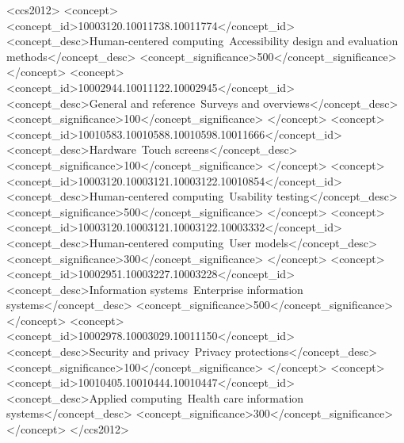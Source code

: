 \documentclass[manuscript, screen, review]{acmart}
\begin{document}
\begin{CCSXML}
<ccs2012>
   <concept>
       <concept_id>10003120.10011738.10011774</concept_id>
       <concept_desc>Human-centered computing~Accessibility design and evaluation methods</concept_desc>
       <concept_significance>500</concept_significance>
       </concept>
   <concept>
       <concept_id>10002944.10011122.10002945</concept_id>
       <concept_desc>General and reference~Surveys and overviews</concept_desc>
       <concept_significance>100</concept_significance>
       </concept>
   <concept>
       <concept_id>10010583.10010588.10010598.10011666</concept_id>
       <concept_desc>Hardware~Touch screens</concept_desc>
       <concept_significance>100</concept_significance>
       </concept>
   <concept>
       <concept_id>10003120.10003121.10003122.10010854</concept_id>
       <concept_desc>Human-centered computing~Usability testing</concept_desc>
       <concept_significance>500</concept_significance>
       </concept>
   <concept>
       <concept_id>10003120.10003121.10003122.10003332</concept_id>
       <concept_desc>Human-centered computing~User models</concept_desc>
       <concept_significance>300</concept_significance>
       </concept>
   <concept>
       <concept_id>10002951.10003227.10003228</concept_id>
       <concept_desc>Information systems~Enterprise information systems</concept_desc>
       <concept_significance>500</concept_significance>
       </concept>
   <concept>
       <concept_id>10002978.10003029.10011150</concept_id>
       <concept_desc>Security and privacy~Privacy protections</concept_desc>
       <concept_significance>100</concept_significance>
       </concept>
   <concept>
       <concept_id>10010405.10010444.10010447</concept_id>
       <concept_desc>Applied computing~Health care information systems</concept_desc>
       <concept_significance>300</concept_significance>
       </concept>
 </ccs2012>
\end{CCSXML}

\end{document}
